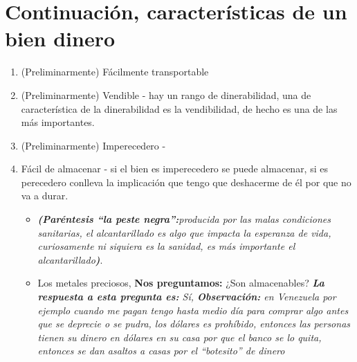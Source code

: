 \section{Continuación, características de un bien dinero}
\begin{enumerate}
    \item (Preliminarmente) Fácilmente transportable
    \item (Preliminarmente) Vendible - hay un rango de dinerabilidad, una de característica de la dinerabilidad es la vendibilidad, de hecho es una de las más importantes. 
    \item (Preliminarmente) Imperecedero -  
    \item Fácil de almacenar - si el bien es imperecedero se puede almacenar, si es perecedero conlleva la implicación que tengo que deshacerme de él por que no va a durar.
        \begin{itemize}
            \item \emph{\textbf{(Paréntesis ``la peste negra'':}producida por las malas condiciones sanitarias, el alcantarillado es algo que impacta la esperanza de vida, curiosamente ni siquiera es la sanidad, es más importante el alcantarillado\textbf{)}}.
            \item Los metales preciosos, \textbf{Nos preguntamos:} ¿Son almacenables? \emph{\textbf{La respuesta a esta pregunta es: }Sí, \emph{\textbf{Observación: }en Venezuela por ejemplo cuando me pagan tengo hasta medio día para comprar algo antes que se deprecie o se pudra, los dólares es prohíbido, entonces las personas tienen su dinero en dólares en su casa por que el banco se lo quita, entonces se dan asaltos a casas por el ``botesito'' de dinero}}
        \end{itemize}
    

\end{enumerate}
